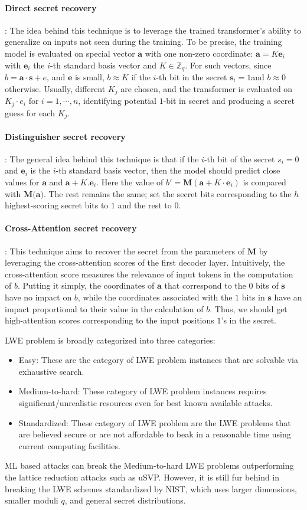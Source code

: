 \paragraph{Direct secret recovery}: The idea behind this technique is to leverage the trained transformer's ability to generalize on inputs not seen during the training. To be precise, the training model is evaluated on special vector $\textbf{a}$ with one non-zero coordinate: $\textbf{a}=K\textbf{e}_i$ with $\textbf{e}_i$ the $i$-th standard basis vector and $K\in \mathbb{Z}_q$. For such vectors, since $b=\textbf{a}\cdot\textbf{s}+e$, and $\textbf{e}$ is small, $b\approx K$ if the $i$-th bit in the secret $\textbf{s}_i=1$and $b \approx 0$ otherwise. Usually, different $K_j$ are chosen, and the transformer is evaluated on $K_j\cdot e_i$ for $i=1,\cdots,n$, identifying potential $1$-bit in secret and producing a secret guess for each $K_j$.

\paragraph{Distinguisher secret recovery}: The general idea behind this technique is that if the $i$-th bit of the secret $s_i=0$ and $\textbf{e}_i$ is the $i$-th standard basis vector, then the model should predict close values for $\textbf{a}$ and $\textbf{a}+K .\textbf{e}_i$. Here the value of $b'=\textbf{M}(\textbf{a}+K \cdot \textbf{e}_i)$
is compared with $\textbf{M(a)}$. The rest remains the same; set the secret bits corresponding to the $h$ highest-scoring secret bits to $1$ and the rest to $0$.

\paragraph{Cross-Attention secret recovery}: This technique aims to recover the secret from the parameters of $\textbf{M}$ by leveraging the cross-attention scores of the first decoder layer. Intuitively, the cross-attention score measures the relevance of input tokens in the computation of $b$. Putting it simply, the coordinates of $\textbf{a}$ that correspond to the $0$ bits of $\textbf{s}$ have no impact on $b$, while the coordinates associated with the $1$ bits in $\textbf{s}$ have an impact proportional to their value in the calculation of $b$. Thus, we should get high-attention scores corresponding to the input positions $1$'s in the secret.


LWE problem is broadly categorized into three categories:
\begin{itemize}
    \item Easy: These are the category of LWE problem instances that are solvable via exhaustive search.
    \item Medium-to-hard: These category of LWE problem instances requires significant/unrealistic resources even for best known available attacks.
    \item Standardized: These category of LWE problem are the LWE problems that are believed secure or are not affordable to beak in a reasonable time using current computing facilities.
\end{itemize}

ML based attacks can break the Medium-to-hard LWE problems outperforming the lattice reduction attacks such as uSVP. However, it is still fur behind in breaking the LWE schemes standardized by NIST, which uses larger dimensions, smaller moduli $q$, and general secret distributions.
